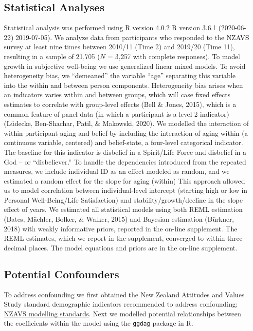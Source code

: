 \documentclass[
  english,
  man,floatsintext]{apa6}
\begin{document}
\hypertarget{statistical-analyses}{%
\subsection{Statistical Analyses}\label{statistical-analyses}}

Statistical analysis was performed using R version 4.0.2 R version 3.6.1 (2020-06-22) 2019-07-05). We analyze data from participants who responded to the NZAVS survey at least nine times between 2010/11 (Time 2) and 2019/20 (Time 11), resulting in a sample of 21,705 (\(N\) = 3,257 with complete responses). To model growth in subjective well-being we use generalized linear mixed models. To avoid heterogeneity bias, we ``demeaned'' the variable ``age'' separating this variable into the within and between person components. Heterogeneity bias arises when an indicators varies within and between groups, which will case fixed effects estimates to correlate with group-level effects (Bell \& Jones, 2015), which is a common feature of panel data (in which a participant is a level-2 indicator)(Lüdecke, Ben-Shachar, Patil, \& Makowski, 2020). We modelled the interaction of within participant aging and belief by including the interaction of aging within (a continuous variable, centered) and belief-state, a four-level categorical indicator. The baseline for this indicator is disbelief in a Spirit/Life Force and disbelief in a God -- or ``disbeliever.'' To handle the dependencies introduced from the repeated measures, we include individual ID as an effect modeled as random, and we estimated a random effect for the slope for aging (within) This approach allowed us to model correlation between individual-level intercept (starting high or low in Personal Well-Being/Life Satisfaction) and stability/growth/decline in the slope effect of years. We estimated all statistical models using both REML estimation (Bates, Mächler, Bolker, \& Walker, 2015) and Bayesian estimation (Bürkner, 2018) with weakly informative priors, reported in the on-line supplement. The REML estimates, which we report in the supplement, converged to within three decimal places. The model equations and priors are in the on-line supplement.

\hypertarget{potential-confounders}{%
\subsection{Potential Confounders}\label{potential-confounders}}

To address confounding we first obtained the New Zealand Attitudes and Values Study standard demographic indicators recommended to address confounding: \href{https://cdn.auckland.ac.nz/assets/psych/about/our-research/nzavs/NZAVSTechnicalDocuments/NZAVS-Technical-Documents-e11-Default-Statistical-Standards.pdf}{NZAVS modelling standards}. Next we modelled potential relationships between the coefficients within the model using the \texttt{ggdag} package in R.
\end{document}
